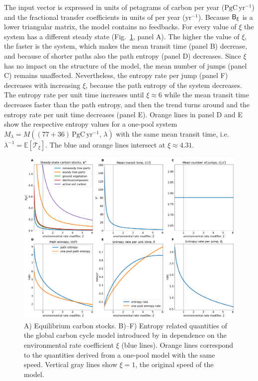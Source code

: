 \documentclass[smallextended]{svjour3}
\newcommand{\E}{\mathbb{E}}
\newcommand{\TT}{\mathcal{T}}
\newcommand{\peta}{\mathrm{P}}
\newcommand{\gC}{\mathrm{gC}}
\newcommand{\yr}{\mathrm{yr}}
\newcommand{\ie}{i.e.}
\begin{document}
The input vector is expressed in units of petagrams of carbon per year ($\peta\gC\,\yr^{-1}$) and the fractional transfer coefficients in units of per year ($\yr^{-1}$).
Because $\mathsf{B}_\xi$ is a lower triangular matrix, the model contains no feedbacks.
For every value of $\xi$ the system has a different steady state (Fig.~\ref{fig:Emanuel_entropies}, panel A).
The higher the value of $\xi$, the faster is the system, which makes the mean transit time (panel B) decrease, and because of shorter paths also the path entropy (panel D) decreases.
Since $\xi$ has no impact on the structure of the model, the mean number of jumps (panel C) remains unaffected.
Nevertheless, the entropy rate per jump (panel F) decreases with increasing $\xi$, because the path entropy of the system decreases.
The entropy rate per unit time increases until $\xi\approx6$ while the mean transit time decreases faster than the path entropy, and then the trend turns around and the entropy rate per unit time decreases (panel E).
Orange lines in panel D and E show the respective entropy values for a one-pool system $M_\lambda=M((77+36)\,\peta\gC\,\yr^{-1},\, \lambda)$ with the same mean transit time, \ie\ $\lambda^{-1} = \E\left[\TT_\xi\right]$.
The blue and orange lines intersect at $\xi\approx4.31$.

\begin{figure}[htbp]
    \centering
    \includegraphics[width=1.0\linewidth]{figs/Emanuel_entropies.png}
    \caption{
    A) Equilibrium carbon stocks. B)--F) Entropy related quantities of the global carbon cycle model introduced by \citet{Emanuel1981} in dependence on the environmental rate coefficient $\xi$ (blue lines).
    Orange lines correspond to the quantities derived from a one-pool model with the same speed.
    Vertical gray lines show $\xi=1$, the original speed of the model.}
    \label{fig:Emanuel_entropies}
\end{figure}
\end{document}
